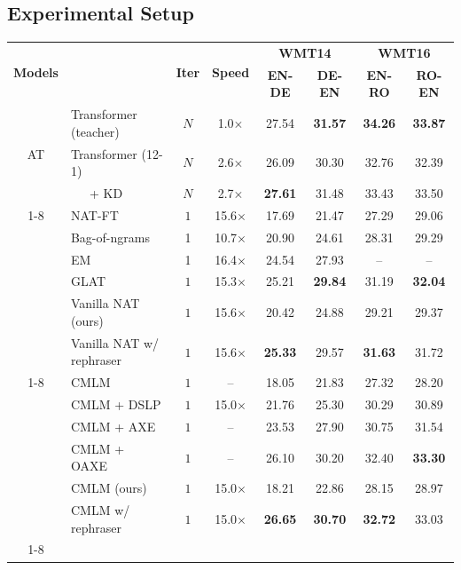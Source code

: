 \documentclass[letterpaper]{article} %
\begin{document}
\subsection{Experimental Setup}
\begin{table}[th!]
\centering
\small
\begin{tabular}{clcccccc}
\toprule
 \multirow{2}{*}{\textbf{Models}} && \multirow{2}{*}{\textbf{Iter}} & \multirow{2}{*}{\textbf{Speed}} &
 \multicolumn{2}{c}{\textbf{WMT14}} & \multicolumn{2}{c}{\textbf{WMT16}} \\
  &&&&\textbf{EN-DE} & \textbf{DE-EN} & \textbf{EN-RO} & \textbf{RO-EN} \\
\midrule
\multirow{3}{*}{AT}
& Transformer (teacher) & $N$& 1.0$\times$&27.54&\bf{31.57}&\bf{34.26}&\bf{33.87} \\
& Transformer (12-1) &$N$& 2.6$\times$&  26.09&30.30&32.76&32.39  \\
& \ \ \ + KD &$N$& 2.7$\times$&  \bf{27.61}&31.48&33.43&33.50  \\
\cmidrule[0.6pt](lr){1-8}
\multirow{6}{*}{Vanilla NAT}
&NAT-FT \cite{gu2017non} &$1$&15.6$\times$&17.69 & 21.47 & 27.29 &  29.06 \\
&Bag-of-ngrams \cite{DBLP:conf/aaai/ShaoZFMZ20} &1&10.7$\times$&20.90 &24.61 &28.31 &29.29\\
&EM \cite{pmlr-v119-sun20c} & 1 & 16.4$\times$ & 24.54 & 27.93 & -- & --\\
&GLAT \cite{qian-etal-2021-glancing} &$1$&15.3$\times$&25.21&\bf{29.84}&31.19&\bf{32.04}\\
&Vanilla NAT (ours)&$1$&15.6$\times$&20.42 &24.88& 29.21& 29.37\\
&Vanilla NAT w/ rephraser &$1$&15.6$\times$& \bf{25.33}& 29.57& \bf{31.63}& 31.72\\
\cmidrule[0.6pt](lr){1-8}
\multirow{6}{*}{CMLM}
& CMLM \cite{ghazvininejad2019maskpredict} & $1$&--&18.05 & 21.83 & 27.32 & 28.20 \\
& CMLM + DSLP \cite{huang2022non} &$1$&15.0$\times$& 21.76 & 25.30 & 30.29 & 30.89 \\
& CMLM + AXE \cite{Aligned} &$1$&--& 23.53 & 27.90 & 30.75 & 31.54 \\
& CMLM + OAXE \cite{DBLP:conf/icml/DuTJ21} &$1$&--&26.10 & 30.20 & 32.40 & \bf{33.30}\\
& CMLM (ours) &$1$&15.0$\times$& 18.21& 22.86&28.15 &28.97 \\
& CMLM w/ rephraser &$1$&15.0$\times$&\bf{26.65} &\bf{30.70}& \bf{32.72}&33.03 \\
\cmidrule[0.6pt](lr){1-8}

\end{tabular}
\end{table}
\end{document}
